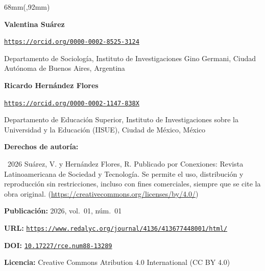 \begin{textblock*}{68mm}(\gbbloquex,92mm)
{\setlength{\leftskip}{0pt}\setlength{\parindent}{0pt}%
\noindent\begin{minipage}[t]{68mm}
\sffamily\small\setlength{\parskip}{1pt}
{\bfseries\color{azulrevista}Valentina Suárez}\par
{\scriptsize\texttt{\href{https://orcid.org/0000-0002-8525-3124}{https://orcid.org/0000-0002-8525-3124}}}\par
Departamento de Sociología, Instituto de Investigaciones Gino Germani, Ciudad Autónoma de Buenos Aires, Argentina\par
\vspace{4pt}
{\bfseries\color{azulrevista}Ricardo Hernández Flores}\par
{\scriptsize\texttt{\href{https://orcid.org/0000-0002-1147-838X}{https://orcid.org/0000-0002-1147-838X}}}\par
Departamento de Educación Superior, Instituto de Investigaciones sobre la Universidad y la Educación (IISUE), Ciudad de México, México\par
\vspace{6pt}
{\bfseries\color{azulrevista!70}Derechos de autor\'ia:}\par
\textcopyright\ 2026 Suárez, V. y Hernández Flores, R. Publicado por Conexiones: Revista Latinoamericana de Sociedad y Tecnología. Se permite el uso, distribución y reproducción sin restricciones, incluso con fines comerciales, siempre que se cite la obra original. (\href{https://creativecommons.org/licenses/by/4.0/}{https://creativecommons.org/licenses/by/4.0/})\par\vspace{6pt}
{\bfseries\color{azulrevista!70}Publicación:} 2026, vol.~01, n\'um.~01\par\vspace{6pt}
{\bfseries\color{azulrevista!70}URL:} {\scriptsize\texttt{\href{https://www.redalyc.org/journal/4136/413677448001/html/}{https://www.redalyc.org/journal/4136/413677448001/html/}}}\par\vspace{6pt}
{\bfseries\color{azulrevista!70}DOI:} {\scriptsize\texttt{\href{https://doi.org/10.17227/rce.num88-13289}{10.17227/rce.num88-13289}}}\par\vspace{6pt}
{\bfseries\color{azulrevista!70}Licencia:} Creative Commons Atribution 4.0 International (CC BY 4.0)\par

\end{minipage}}
\end{textblock*}

